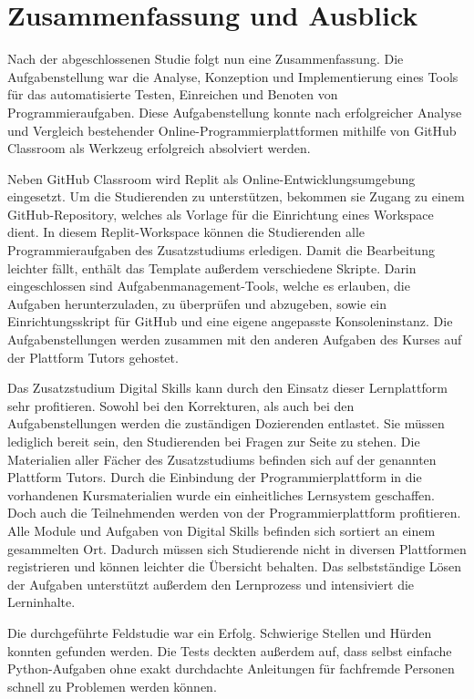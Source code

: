 \section{Zusammenfassung und Ausblick}\label{zusammenfassung-u-ausblick}
Nach der abgeschlossenen Studie folgt nun eine Zusammenfassung. Die
Aufgabenstellung war die Analyse, Konzeption und Implementierung eines Tools
für das automatisierte Testen, Einreichen und Benoten von Programmieraufgaben.
Diese Aufgabenstellung konnte nach erfolgreicher Analyse und Vergleich
bestehender Online-Programmierplattformen mithilfe von GitHub Classroom als
Werkzeug erfolgreich absolviert werden.

Neben GitHub Classroom wird Replit als Online-Entwicklungsumgebung eingesetzt.
Um die Studierenden zu unterstützen, bekommen sie Zugang zu einem
GitHub-Repository, welches als Vorlage für die Einrichtung eines Workspace
dient. In diesem Replit-Workspace können die Studierenden alle
Programmieraufgaben des Zusatzstudiums erledigen. Damit die Bearbeitung leichter
fällt, enthält das Template außerdem verschiedene Skripte. Darin eingeschlossen
sind Aufgabenmanagement-Tools, welche es erlauben, die Aufgaben herunterzuladen,
zu überprüfen und abzugeben, sowie ein Einrichtungsskript für GitHub und eine
eigene angepasste Konsoleninstanz. Die Aufgabenstellungen werden zusammen mit
den anderen Aufgaben des Kurses auf der Plattform Tutors gehostet.

Das Zusatzstudium Digital Skills kann durch den Einsatz dieser
Lernplattform sehr profitieren. Sowohl bei den Korrekturen, als auch bei den 
Aufgabenstellungen werden die zuständigen Dozierenden entlastet. Sie müssen
lediglich bereit sein, den Studierenden bei Fragen zur Seite zu stehen. Die
Materialien aller Fächer des Zusatzstudiums befinden sich auf der genannten
Plattform Tutors. Durch die Einbindung der Programmierplattform in die
vorhandenen Kursmaterialien wurde ein einheitliches Lernsystem geschaffen. Doch
auch die Teilnehmenden werden von der Programmierplattform profitieren. Alle
Module und Aufgaben von Digital Skills befinden sich sortiert an einem
gesammelten Ort. Dadurch müssen sich Studierende nicht in diversen Plattformen 
registrieren und können leichter die Übersicht behalten. Das selbstständige
Lösen der Aufgaben unterstützt außerdem den Lernprozess und intensiviert die
Lerninhalte.

Die durchgeführte Feldstudie war ein Erfolg. Schwierige Stellen und Hürden
konnten gefunden werden. Die Tests deckten außerdem auf, dass selbst einfache
Python-Aufgaben ohne exakt durchdachte Anleitungen für fachfremde Personen
schnell zu Problemen werden können.

